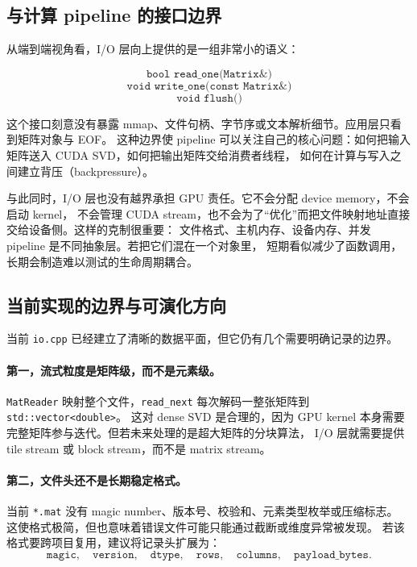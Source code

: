 \subsection{与计算 pipeline 的接口边界}

从端到端视角看，I/O 层向上提供的是一组非常小的语义：

\[
    \texttt{bool read\_one(Matrix\&)}
\]
\[
    \texttt{void write\_one(const Matrix\&)}
\]
\[
    \texttt{void flush()}
\]

这个接口刻意没有暴露 mmap、文件句柄、字节序或文本解析细节。应用层只看到矩阵对象与 EOF。
这种边界使 pipeline 可以关注自己的核心问题：如何把输入矩阵送入 CUDA SVD，如何把输出矩阵交给消费者线程，
如何在计算与写入之间建立背压（backpressure）。

与此同时，I/O 层也没有越界承担 GPU 责任。它不会分配 device memory，不会启动 kernel，
不会管理 CUDA stream，也不会为了“优化”而把文件映射地址直接交给设备侧。这样的克制很重要：
文件格式、主机内存、设备内存、并发 pipeline 是不同抽象层。若把它们混在一个对象里，
短期看似减少了函数调用，长期会制造难以测试的生命周期耦合。

\subsection{当前实现的边界与可演化方向}

当前 \texttt{io.cpp} 已经建立了清晰的数据平面，但它仍有几个需要明确记录的边界。

\paragraph{第一，流式粒度是矩阵级，而不是元素级。}
\texttt{MatReader} 映射整个文件，\texttt{read\_next} 每次解码一整张矩阵到 \texttt{std::vector<double>}。
这对 dense SVD 是合理的，因为 GPU kernel 本身需要完整矩阵参与迭代。但若未来处理的是超大矩阵的分块算法，
I/O 层就需要提供 tile stream 或 block stream，而不是 matrix stream。

\paragraph{第二，文件头还不是长期稳定格式。}
当前 \texttt{*.mat} 没有 magic number、版本号、校验和、元素类型枚举或压缩标志。
这使格式极简，但也意味着错误文件可能只能通过截断或维度异常被发现。
若该格式要跨项目复用，建议将记录头扩展为：
\[
    \texttt{magic},\quad \texttt{version},\quad \texttt{dtype},\quad
    \texttt{rows},\quad \texttt{columns},\quad \texttt{payload\_bytes}.
\]

